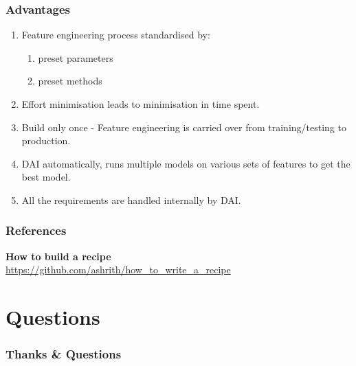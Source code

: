 \documentclass[11pt,
               aspectratio=169,
               hyperref={colorlinks}
               ]{beamer}
\begin{document}
	\begin{frame}
		\frametitle{Advantages}
		\begin{enumerate}
			\item Feature engineering process standardised by:
				\begin{enumerate}
					\item preset parameters
					\item preset methods
				\end{enumerate}
			\item Effort minimisation leads to minimisation in time spent.
			\item Build only once - Feature engineering is carried over from training/testing to production.
			\item DAI automatically, runs multiple models on various sets of features to get the best model. 
			\item All the requirements are handled internally by DAI. 
		\end{enumerate}
\end{frame}

	\begin{frame}[t, allowframebreaks]
	
		\frametitle{References}	
		
			\textbf{How to build a recipe}\\
			\small{\url{https://github.com/ashrith/how_to_write_a_recipe}}
			
		\framebreak		
		
		\printbibliography
		
	\end{frame}
	\section{Questions}

		\begin{frame}

			\frametitle{Thanks \& Questions}

		\end{frame}

\end{document}
